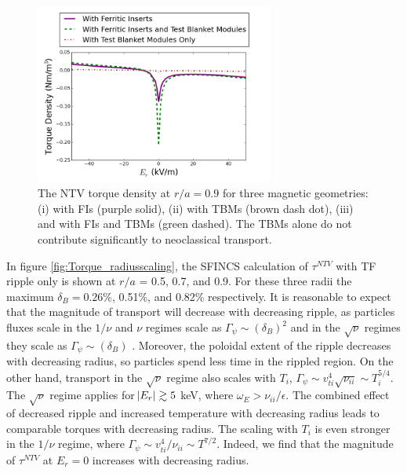 \documentclass{article}
\numberwithin{figure}{section}
\numberwithin{equation}{section}
\begin{document}
\begin{figure}[h!]
\centering
\includegraphics[width=0.7\textwidth]{Torque_comparingTBMandFI.png}
\caption{\label{fig:Torque_comparingTBMandFI} The NTV torque density at $r/a = 0.9$ for three magnetic geometries: (i) with FIs (purple solid), (ii) with TBMs (brown dash dot), (iii) and with FIs and TBMs (green dashed). The TBMs alone do not contribute significantly to neoclassical transport. }
\end{figure}

In figure \ref{fig:Torque_radiusscaling}, the SFINCS calculation of $\tau^{NTV}$ with TF ripple only is shown at $r/a$ = 0.5, 0.7, and 0.9. For these three radii the maximum $\delta_B = 0.26\%$,  0.51\%, and 0.82\% respectively. It is reasonable to expect that the magnitude of transport will decrease with decreasing ripple, as particles fluxes scale in the $1/\nu$ and $\nu$ regimes scale as $\Gamma_{\psi} \sim (\delta_B)^2$ and in the $\sqrt{\nu}$ regimes they scale as $ \Gamma_{\psi}\sim (\delta_B)$ \cite{Shaing2010}.  Moreover, the poloidal extent of the ripple decreases with decreasing radius, so particles spend less time in the rippled region. On the other hand, transport in the $\sqrt{\nu}$ regime also scales with $T_i$, $\Gamma_{\psi} \sim v_{ti}^4 \sqrt{\nu_{ii}} \sim T_i^{5/4}$. The $\sqrt{\nu}$ regime applies for $\abs{E_r} \gtrsim 5$ keV, where $\omega_E > \nu_{ii}/\epsilon$. The combined effect of decreased ripple and increased temperature with decreasing radius leads to comparable torques with decreasing radius. The scaling with $T_i$ is even stronger in the $1/\nu$ regime, where $\Gamma_{\psi} \sim v_{ti}^4/\nu_{ii} \sim T^{7/2}$. Indeed, we find that the magnitude of $\tau^{NTV}$ at $E_r = 0$ increases with decreasing radius. 
\end{document}
